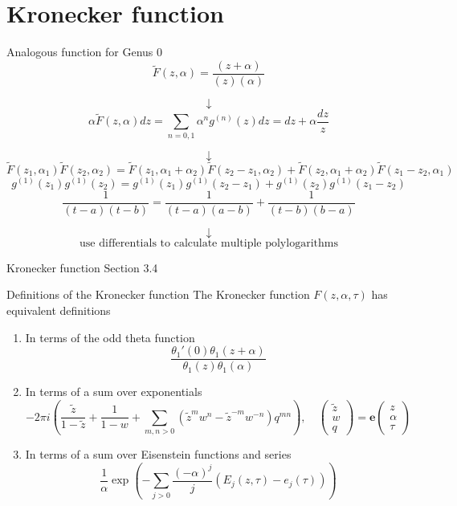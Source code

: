 \documentclass[11pt,aspectratio=169]{beamer}
\newcommand{\ee}[0]{\mathbf{e}}
\begin{document}
\section{Kronecker function}

\begin{frame}{Analogous function for Genus 0}
    \[\tilde F(z,\alpha) = \frac{(z+\alpha)}{(z)(\alpha)}\]

    \pause{}

    \[\downarrow\]
    \[\alpha \tilde F(z,\alpha) dz = \sum_{n=0,1} \alpha^n g^{(n)}(z) dz = dz + \alpha \frac{dz}{z}\]
    
    \pause{}
    
    \[\downarrow\]
    \[\tilde{F}(z_1,\alpha_1)\tilde{F}(z_2,\alpha_2) = \tilde{F}(z_1,\alpha_1+\alpha_2)\tilde{F}(z_2-z_1,\alpha_2) + \tilde{F}(z_2,\alpha_1+\alpha_2)\tilde{F}(z_1-z_2,\alpha_1)\]
    \[g^{(1)}(z_1)g^{(1)}(z_2) = g^{(1)}(z_1)g^{(1)}(z_2-z_1) + g^{(1)}(z_2)g^{(1)}(z_1-z_2)\]
    \[\frac{1}{(t-a)(t-b)} = \frac{1}{(t-a)(a-b)} + \frac{1}{(t-b)(b-a)}\]
    
    \pause{}
    
    \[\downarrow\]
    \[\text{use differentials to calculate multiple polylogarithms}\]
\end{frame}

\begin{frame}{Kronecker function}{\tiny \cite{BL13} Section 3.4}
    \begin{block}{Definitions of the Kronecker function}
        The Kronecker function $F(z,\alpha,\tau)$ has equivalent definitions
        \begin{enumerate}
            \item In terms of the odd theta function
            \[\frac{\theta_1'(0)\theta_1(z+\alpha)}{\theta_1(z)\theta_1(\alpha)}\]
            \item In terms of a sum over exponentials
            \[-2\pi i \left(\frac{\tilde z}{1-\tilde z} + \frac{1}{1-w} + \sum_{m,n > 0} (\tilde z^m w^n - \tilde z^{-m} w^{-n}) q^{mn}\right) , \quad \begin{pmatrix} \tilde z \\ w \\ q \end{pmatrix} = \ee \begin{pmatrix}z \\ \alpha \\ \tau\end{pmatrix}\]
            \item In terms of a sum over Eisenstein functions and series
            \[\frac{1}{\alpha} \exp\left(-\sum_{j > 0} \frac{(-\alpha)^j}{j} (E_j(z,\tau) - e_j(\tau))\right)\]
        \end{enumerate}
    \end{block}
\end{frame}
\end{document}
